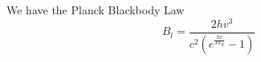 \documentclass[11pt]{article}
\makeatletter
\newcommand{\boxspacing}{\kern\kvtcb@left@rule\kern\kvtcb@boxsep}
\newcommand{\prompt}[4]{
        {\ttfamily\llap{{\color{#2}[#3]:\hspace{3pt}#4}}\vspace{-\baselineskip}}
    }
\makeatother
\begin{document}
            
\prompt{Out}{outcolor}{17}{}
    
    We have the Planck Blackbody
Law\begin{equation} B_l = \frac{2 h v^{3}}{c^{2} \left(e^{\frac{h v}{T k_{B}}} - 1\right)}\end{equation}

    

    \begin{tcolorbox}[breakable, size=fbox, boxrule=1pt, pad at break*=1mm,colback=cellbackground, colframe=cellborder]
\prompt{In}{incolor}{ }{\boxspacing}
\begin{Verbatim}[commandchars=\\\{\}]

\end{Verbatim}
\end{tcolorbox}
\end{document}
